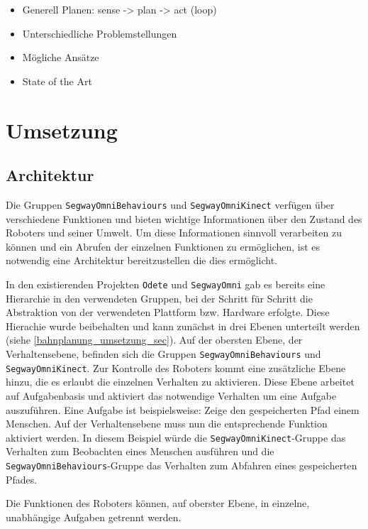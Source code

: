 \begin{itemize}
\item Generell Planen: sense -> plan -> act (loop)
\item Unterschiedliche Problemstellungen
\item Mögliche Ansätze
\item State of the Art
\end{itemize}


\section{Umsetzung}
\label{umsetzung_integration_sec}

\subsection{Architektur}
\label{integration_architektur_sec}

Die Gruppen \lstinline{SegwayOmniBehaviours} und \lstinline{SegwayOmniKinect} verfügen über verschiedene Funktionen und bieten wichtige Informationen über den Zustand des Roboters und seiner Umwelt. Um diese Informationen sinnvoll verarbeiten zu können und ein Abrufen der einzelnen Funktionen zu ermöglichen, ist es notwendig eine Architektur bereitzustellen die dies ermöglicht.

In den existierenden Projekten \lstinline{Odete} und \lstinline{SegwayOmni} gab es bereits eine Hierarchie in den verwendeten Gruppen, bei der Schritt für Schritt die Abstraktion von der verwendeten Plattform bzw. Hardware erfolgte. Diese Hierachie wurde beibehalten und kann zunächst in drei Ebenen unterteilt werden (siehe \ref{bahnplanung_umsetzung_sec}). Auf der obersten Ebene, der Verhaltensebene, befinden sich die Gruppen \lstinline{SegwayOmniBehaviours} und \lstinline{SegwayOmniKinect}. Zur Kontrolle des Roboters kommt eine zusätzliche Ebene hinzu, die es erlaubt die einzelnen Verhalten zu aktivieren. Diese Ebene arbeitet auf Aufgabenbasis und aktiviert das notwendige Verhalten um eine Aufgabe auszuführen. Eine Aufgabe ist beispielsweise: Zeige den gespeicherten Pfad einem Menschen. Auf der Verhaltensebene muss nun die entsprechende Funktion aktiviert werden. In diesem Beispiel würde die \lstinline{SegwayOmniKinect}-Gruppe das Verhalten zum Beobachten eines Menschen ausführen und die \lstinline{SegwayOmniBehaviours}-Gruppe das Verhalten zum Abfahren eines gespeicherten Pfades.

Die Funktionen des Roboters können, auf oberster Ebene, in einzelne, unabhängige Aufgaben getrennt werden. 

